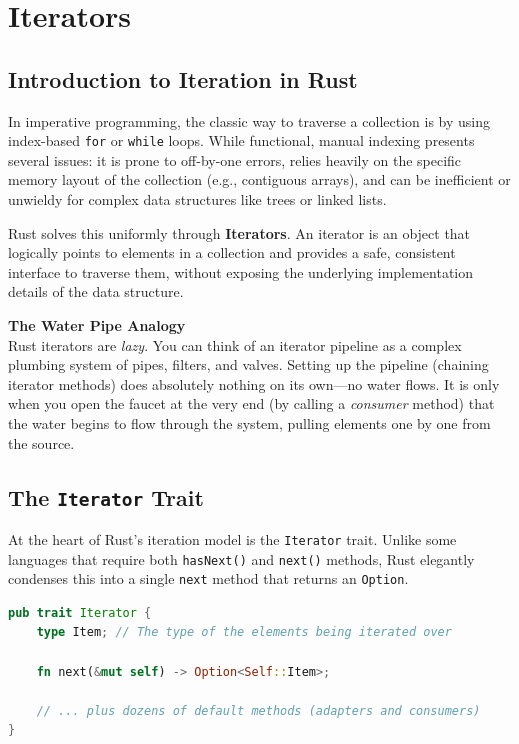 \chapter{Iterators}

\section{Introduction to Iteration in Rust}
In imperative programming, the classic way to traverse a collection is by using index-based \texttt{for} or \texttt{while} loops. While functional, manual indexing presents several issues: it is prone to off-by-one errors, relies heavily on the specific memory layout of the collection (e.g., contiguous arrays), and can be inefficient or unwieldy for complex data structures like trees or linked lists.

Rust solves this uniformly through \textbf{Iterators}. An iterator is an object that logically points to elements in a collection and provides a safe, consistent interface to traverse them, without exposing the underlying implementation details of the data structure.

\begin{insightbox}
\textbf{The Water Pipe Analogy} \\
Rust iterators are \textit{lazy}. You can think of an iterator pipeline as a complex plumbing system of pipes, filters, and valves. Setting up the pipeline (chaining iterator methods) does absolutely nothing on its own—no water flows. It is only when you open the faucet at the very end (by calling a \textit{consumer} method) that the water begins to flow through the system, pulling elements one by one from the source.
\end{insightbox}

\section{The \texttt{Iterator} Trait}
At the heart of Rust's iteration model is the \texttt{Iterator} trait. Unlike some languages that require both \texttt{hasNext()} and \texttt{next()} methods, Rust elegantly condenses this into a single \texttt{next} method that returns an \texttt{Option}.

\begin{lstlisting}[language=Rust]
pub trait Iterator {
    type Item; // The type of the elements being iterated over

    fn next(&mut self) -> Option<Self::Item>;
    
    // ... plus dozens of default methods (adapters and consumers)
}
\end{lstlisting}

